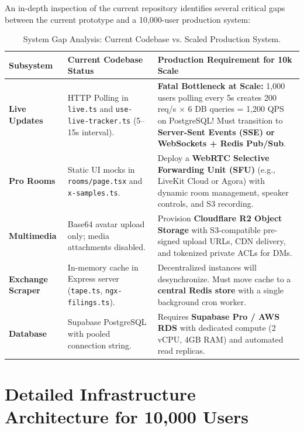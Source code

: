 \documentclass[11pt,a4paper]{article}
\begin{document}
An in-depth inspection of the current repository identifies several critical gaps between the current prototype and a 10,000-user production system:

\begin{table}[h!]
\centering
\small
\begin{tabularx}{\textwidth}{l p{4.2cm} X}
\toprule
\textbf{Subsystem} & \textbf{Current Codebase Status} & \textbf{Production Requirement for 10k Scale} \\
\midrule
\textbf{Live Updates} & HTTP Polling in \texttt{live.ts} and \texttt{use-live-tracker.ts} (5--15s interval). & \textbf{Fatal Bottleneck at Scale:} 1,000 users polling every 5s creates 200 req/s $\times$ 6 DB queries = 1,200 QPS on PostgreSQL! Must transition to \textbf{Server-Sent Events (SSE) or WebSockets + Redis Pub/Sub}. \\
\addlinespace
\textbf{Pro Rooms} & Static UI mocks in \texttt{rooms/page.tsx} and \texttt{x-samples.ts}. & Deploy a \textbf{WebRTC Selective Forwarding Unit (SFU)} (e.g., LiveKit Cloud or Agora) with dynamic room management, speaker controls, and S3 recording. \\
\addlinespace
\textbf{Multimedia} & Base64 avatar upload only; media attachments disabled. & Provision \textbf{Cloudflare R2 Object Storage} with S3-compatible pre-signed upload URLs, CDN delivery, and tokenized private ACLs for DMs. \\
\addlinespace
\textbf{Exchange Scraper} & In-memory cache in Express server (\texttt{tape.ts}, \texttt{ngx-filings.ts}). & Decentralized instances will desynchronize. Must move cache to a \textbf{central Redis store} with a single background cron worker. \\
\addlinespace
\textbf{Database} & Supabase PostgreSQL with pooled connection string. & Requires \textbf{Supabase Pro / AWS RDS} with dedicated compute (2 vCPU, 4GB RAM) and automated read replicas. \\
\bottomrule
\end{tabularx}
\caption{System Gap Analysis: Current Codebase vs. Scaled Production System.}
\end{table}

\section{Detailed Infrastructure Architecture for 10,000 Users}
\end{document}
